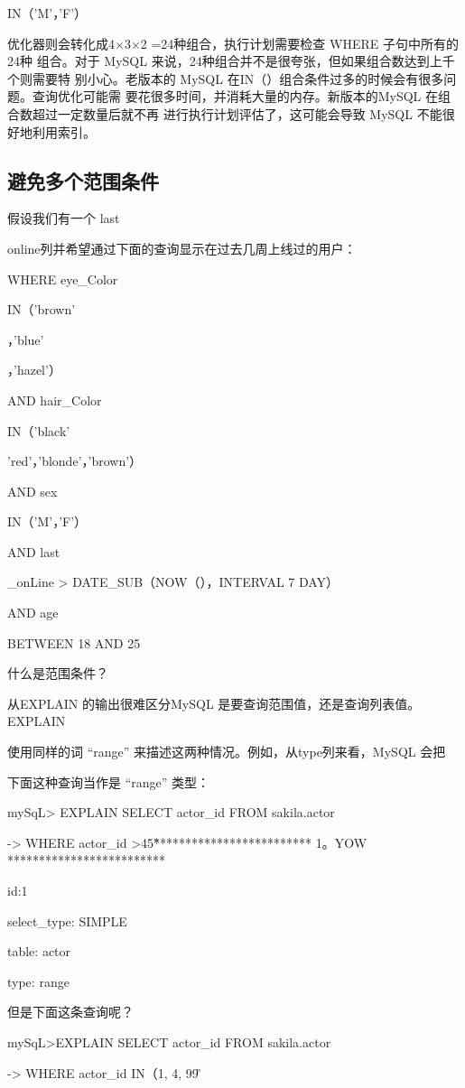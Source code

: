 IN（'M'，'F'）

优化器则会转化成4×3×2 =24种组合，执行计划需要检查 WHERE 子句中所有的24种
组合。对于 MySQL 来说，24种组合并不是很夸张，但如果组合数达到上千个则需要特
别小心。老版本的 MySQL 在IN（）组合条件过多的时候会有很多问题。查询优化可能需
要花很多时间，并消耗大量的内存。新版本的MySQL 在组合数超过一定数量后就不再
进行执行计划评估了，这可能会导致 MySQL 不能很好地利用索引。

\subsection{避免多个范围条件}
假设我们有一个 last

online列并希望通过下面的查询显示在过去几周上线过的用户：

WHERE eye\_Color

IN（'brown'

，'blue'

，'hazel'）

AND hair\_Color

IN（'black'

'red'，'blonde'，'brown'）

AND sex

IN（'M'，'F'）

AND last

\_onLine > DATE\_SUB（NOW（），INTERVAL 7 DAY）

AND age

BETWEEN 18 AND 25

什么是范围条件？

从EXPLAIN 的输出很难区分MySQL 是要查询范围值，还是查询列表值。EXPLAIN

使用同样的词 “range” 来描述这两种情况。例如，从type列来看，MySQL 会把

下面这种查询当作是 “range” 类型：

mySqL> EXPLAIN SELECT actor\_id FROM sakila.actor

-> WHERE actor\_id >45\G

************************* 1。YOW *************************

id:1

select\_type: SIMPLE

table: actor

type: range

但是下面这条查询呢？

mySqL>EXPLAIN SELECT actor\_id FROM sakila.actor

-> WHERE actor\_id IN（1, 4, 99）\G

